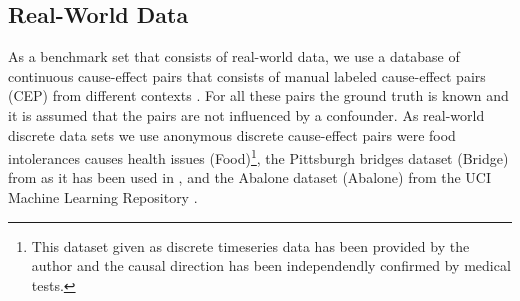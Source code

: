 \documentclass[letterpaper]{article}
\begin{document}
\subsection{Real-World Data}

As a benchmark set that consists of real-world data, we use a database of continuous cause-effect pairs that consists of manual labeled cause-effect pairs (CEP) from different contexts \cite{MPJZS16, DG19}. For all these pairs the ground truth is known and it is assumed that the pairs are not influenced by a confounder. As real-world discrete data sets we use anonymous discrete cause-effect pairs were food intolerances causes health issues (Food)\footnote{This dataset given as discrete timeseries data has been provided by the author and the causal direction has been independendly confirmed by medical tests.}, the Pittsburgh bridges dataset (Bridge) from \cite{DG19} as it has been used in \cite{CQZZH18}, and the Abalone dataset (Abalone) from the UCI Machine Learning Repository \cite{DG19}.
\end{document}
